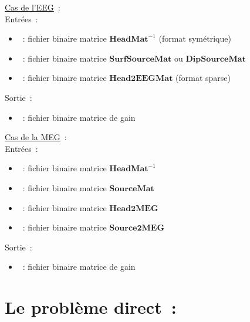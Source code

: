 \checkItem \underline{Cas de l'EEG}~:\\
Entrées~:
\begin{itemize}
    \item {}~: fichier binaire matrice $\mathbf{HeadMat}^{-1}$ (format symétrique)
    \item {}~: fichier binaire matrice $\mathbf{SurfSourceMat}$ ou $\mathbf{DipSourceMat}$
    \item {}~: fichier binaire matrice $\mathbf{Head2EEGMat}$ (format sparse)
\end{itemize}
Sortie~:
\begin{itemize}
    \item {}~: fichier binaire matrice de gain
\end{itemize}

\medskip

\noindent
{}


\bigskip

\checkItem\underline{Cas de la MEG}~:\\
Entrées~:
\begin{itemize}
    \item {}~: fichier binaire matrice $\mathbf{HeadMat}^{-1}$
    \item {}~: fichier binaire matrice $\mathbf{SourceMat}$
    \item {}~: fichier binaire matrice $\mathbf{Head2MEG}$
    \item {}~: fichier binaire matrice $\mathbf{Source2MEG}$
\end{itemize}
Sortie~:
\begin{itemize}
    \item {}~: fichier binaire matrice de gain
\end{itemize}

\medskip

\noindent
{}


\section{Le problème direct~:}
\label{sect: command direct}


